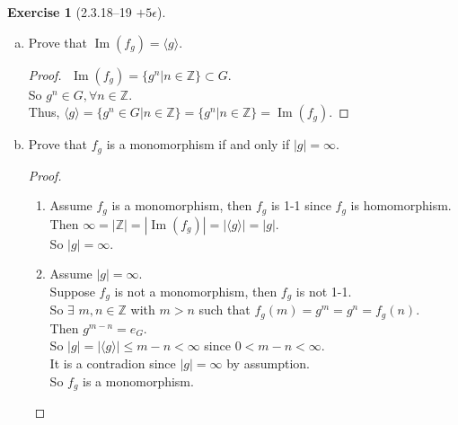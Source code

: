 \documentclass{amsart}
\newcommand{\bbz}{\mathbb{Z}}
\newcommand{\im}{\operatorname{Im}}
\theoremstyle{plain}
\theoremstyle{definition}
\newtheorem{exer}[lem]{Exercise}
\begin{document}
\begin{exer}[2.3.18--19 $+5\epsilon$]
\begin{enumerate}[(a)]
\item Prove that $\im(f_g)=\langle g\rangle$.
	\begin{proof}
		$ $\newline
		$\im(f_g) = \{g^n | n \in \bbz\} \subset G$.\\
		So $g^n \in G, \forall n \in \bbz$.\\
		Thus, $\langle g \rangle = \{g^n \in G | n \in \bbz\} = \{g^n | n \in \bbz\} = \im(f_g)$.
	\end{proof}
\item Prove that $f_g$ is a monomorphism if and only if $|g|=\infty$.
	\begin{proof}
		$ $\newline
		\begin{enumerate}
			\item
				Assume $f_g$ is a monomorphism, then $f_g$ is 1-1 since $f_g$ is homomorphism.\\
				Then $\infty= |\bbz| = |\im(f_g)| = |\langle g \rangle| = |g|$.\\
				So $|g| = \infty$.
			\item 
				Assume $|g| = \infty$.\\
				Suppose $f_g$ is not a monomorphism, then $f_g$ is not 1-1.\\
				So $\exists$ $m,n \in \bbz$ with $m > n$ such that $f_g(m) = g^m = g^n= f_g(n)$.\\
				Then $g^{m-n} = e_G$.\\
				So $|g| = |\langle g \rangle| \leq m-n < \infty$ since $0< m-n < \infty$.\\
				It is a contradion since $|g| = \infty$ by assumption.\\
				So $f_g$ is a monomorphism.
		\end{enumerate}

	\end{proof}


\end{enumerate}
\end{exer}
\end{document}
